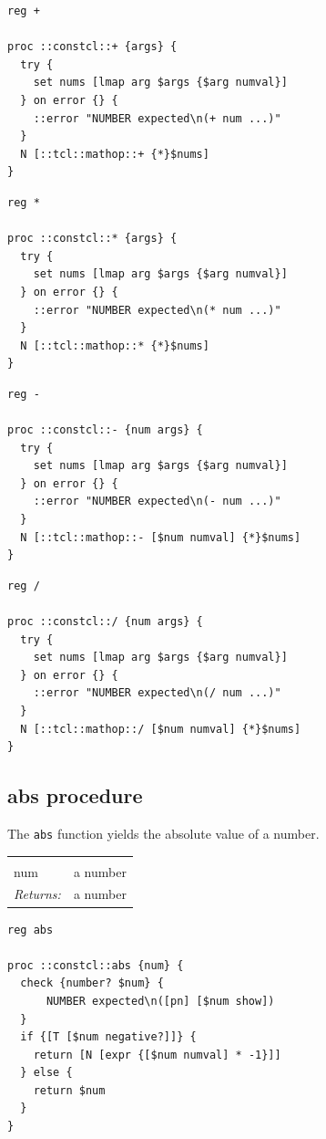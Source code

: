 \documentclass[twoside]{report}
\begin{document}
\begin{lstlisting}
reg +

proc ::constcl::+ {args} {
  try {
    set nums [lmap arg $args {$arg numval}]
  } on error {} {
    ::error "NUMBER expected\n(+ num ...)"
  }
  N [::tcl::mathop::+ {*}$nums]
}
\end{lstlisting}

\begin{lstlisting}
reg *

proc ::constcl::* {args} {
  try {
    set nums [lmap arg $args {$arg numval}]
  } on error {} {
    ::error "NUMBER expected\n(* num ...)"
  }
  N [::tcl::mathop::* {*}$nums]
}
\end{lstlisting}

\begin{lstlisting}
reg -

proc ::constcl::- {num args} {
  try {
    set nums [lmap arg $args {$arg numval}]
  } on error {} {
    ::error "NUMBER expected\n(- num ...)"
  }
  N [::tcl::mathop::- [$num numval] {*}$nums]
}
\end{lstlisting}

\begin{lstlisting}
reg /

proc ::constcl::/ {num args} {
  try {
    set nums [lmap arg $args {$arg numval}]
  } on error {} {
    ::error "NUMBER expected\n(/ num ...)"
  }
  N [::tcl::mathop::/ [$num numval] {*}$nums]
}
\end{lstlisting}

\subsection{abs procedure}
\label{abs-procedure}

The \texttt{abs} function yields the absolute value of a number.

\noindent\begin{tabular}{ |p{1.9cm} p{8cm}| }
\hline
\rowcolor[HTML]{CCCCCC} \multicolumn{2}{|l|}{\bf abs (public)} \\
num & a number \\
\textit{Returns:} & a number \\
\hline
\end{tabular}

\begin{lstlisting}
reg abs

proc ::constcl::abs {num} {
  check {number? $num} {
      NUMBER expected\n([pn] [$num show])
  }
  if {[T [$num negative?]]} {
    return [N [expr {[$num numval] * -1}]]
  } else {
    return $num
  }
}
\end{lstlisting}
\end{document}
